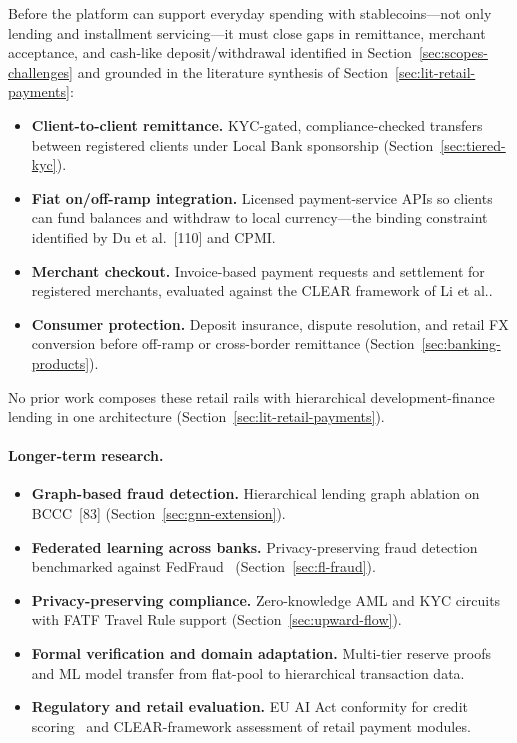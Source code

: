 \documentclass[12pt, a4paper]{report}
\begin{document}
Before the platform can support everyday spending with stablecoins---not only lending and installment servicing---it must close gaps in remittance, merchant acceptance, and cash-like deposit/withdrawal identified in Section~\ref{sec:scopes-challenges} and grounded in the literature synthesis of Section~\ref{sec:lit-retail-payments}:
\begin{itemize}[noitemsep]
\item \textbf{Client-to-client remittance.} KYC-gated, compliance-checked transfers between registered clients under Local Bank sponsorship (Section~\ref{sec:tiered-kyc}).
\item \textbf{Fiat on/off-ramp integration.} Licensed payment-service APIs so clients can fund balances and withdraw to local currency---the binding constraint identified by Du et al.~[110] and CPMI.
\item \textbf{Merchant checkout.} Invoice-based payment requests and settlement for registered merchants, evaluated against the CLEAR framework of Li et al..
\item \textbf{Consumer protection.} Deposit insurance, dispute resolution, and retail FX conversion before off-ramp or cross-border remittance (Section~\ref{sec:banking-products}).
\end{itemize}
No prior work composes these retail rails with hierarchical development-finance lending in one architecture (Section~\ref{sec:lit-retail-payments}).

\paragraph{Longer-term research.}
\begin{itemize}[noitemsep]
\item \textbf{Graph-based fraud detection.} Hierarchical lending graph ablation on BCCC~[83] (Section~\ref{sec:gnn-extension}).
\item \textbf{Federated learning across banks.} Privacy-preserving fraud detection benchmarked against FedFraud~ (Section~\ref{sec:fl-fraud}).
\item \textbf{Privacy-preserving compliance.} Zero-knowledge AML and KYC circuits with FATF Travel Rule support (Section~\ref{sec:upward-flow}).
\item \textbf{Formal verification and domain adaptation.} Multi-tier reserve proofs~ and ML model transfer from flat-pool to hierarchical transaction data.
\item \textbf{Regulatory and retail evaluation.} EU AI Act conformity for credit scoring~ and CLEAR-framework assessment of retail payment modules.
\end{itemize}
\end{document}
